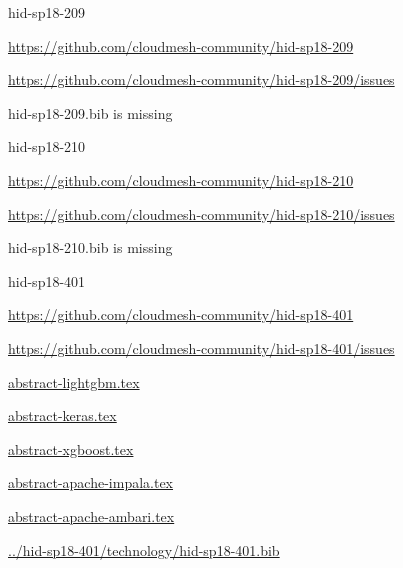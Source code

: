 \begin{IU}

hid-sp18-209

\url{https://github.com/cloudmesh-community/hid-sp18-209}

\url{https://github.com/cloudmesh-community/hid-sp18-209/issues}

hid-sp18-209.bib is missing

\end{IU}


\begin{IU}

hid-sp18-210

\url{https://github.com/cloudmesh-community/hid-sp18-210}

\url{https://github.com/cloudmesh-community/hid-sp18-210/issues}

hid-sp18-210.bib is missing

\end{IU}


\begin{IU}

hid-sp18-401

\url{https://github.com/cloudmesh-community/hid-sp18-401}

\url{https://github.com/cloudmesh-community/hid-sp18-401/issues}

\href{https://github.com/cloudmesh-community/hid-sp18-401/blob/master//technology/abstract-lightgbm.tex}{abstract-lightgbm.tex}

\href{https://github.com/cloudmesh-community/hid-sp18-401/blob/master//technology/abstract-keras.tex}{abstract-keras.tex}

\href{https://github.com/cloudmesh-community/hid-sp18-401/blob/master//technology/abstract-xgboost.tex}{abstract-xgboost.tex}

\href{https://github.com/cloudmesh-community/hid-sp18-401/blob/master//technology/abstract-apache-impala.tex}{abstract-apache-impala.tex}

\href{https://github.com/cloudmesh-community/hid-sp18-401/blob/master//technology/abstract-apache-ambari.tex}{abstract-apache-ambari.tex}

\href{https://github.com/cloudmesh-community/hid-sp18-401/blob/master//technology/hid-sp18-401.bib}{../hid-sp18-401/technology/hid-sp18-401.bib}

\end{IU}


